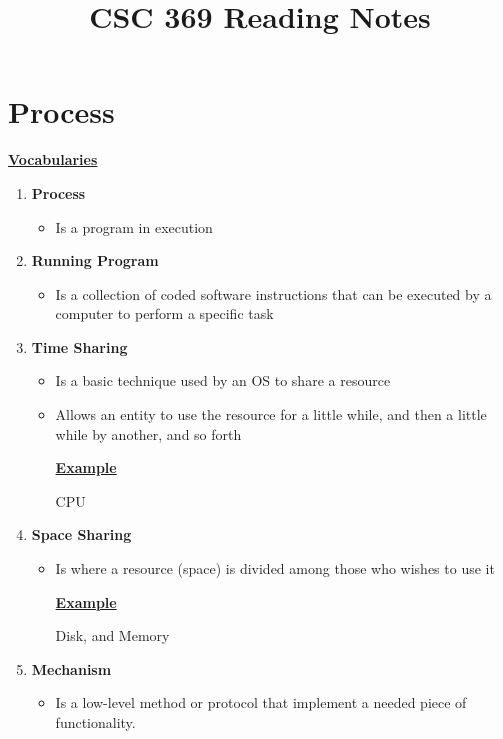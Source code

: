 \documentclass[12pt]{article}
\begin{document}
\title{CSC 369 Reading Notes}

\section{Process}

\begin{mdframed}
\underline{\textbf{Vocabularies}}

\bigskip

\begin{enumerate}[1.]
    \item \textbf{Process}
    \begin{itemize}
        \item Is a program in execution
    \end{itemize}
    \item \textbf{Running Program}
    \begin{itemize}
        \item Is a collection of coded software instructions that can be executed
        by a computer to perform a specific task
    \end{itemize}
    \item \textbf{Time Sharing}
    \begin{itemize}
        \item Is a basic technique used by an OS to share a resource
        \item Allows an entity to use the resource for a little while, and then
        a little while by another, and so forth

        \bigskip

        \underline{\textbf{Example}}

        \bigskip

        CPU

    \end{itemize}
    \item \textbf{Space Sharing}
    \begin{itemize}
        \item Is where a resource (space) is divided among those who wishes to use it

        \bigskip

        \underline{\textbf{Example}}

        \bigskip

        Disk, and Memory
    \end{itemize}
    \item \textbf{Mechanism}
    \begin{itemize}
        \item Is a low-level method or protocol that implement a needed piece of
        functionality.


\end{itemize}
\end{enumerate}
\end{mdframed}
\end{document}
